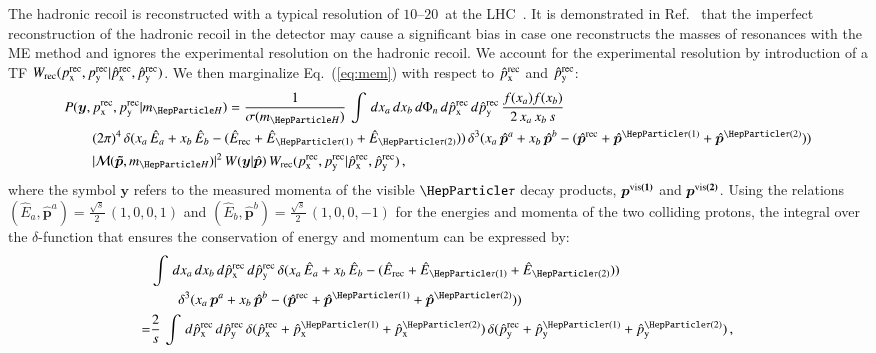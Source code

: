The hadronic recoil is reconstructed with a typical resolution of $10$--$20$~\GeV at the LHC~\cite{CMS-JME-13-003,ATLAS-CONF-2014-019}.
It is demonstrated in Ref.~\cite{Alwall:2010cq} that the imperfect reconstruction of the hadronic recoil
in the detector may cause a significant bias in case one reconstructs the masses of resonances
with the ME method and ignores the experimental resolution on the
hadronic recoil. We account
for the experimental resolution by introduction
of a TF $W_{\textrm{rec}}( p_{\textrm{x}}^{\textrm{rec}}, p_{\textrm{y}}^{\textrm{rec}} | \hat{p}_{\textrm{x}}^{\textrm{rec}},
\hat{p}_{\textrm{y}}^{\textrm{rec}} )$.
We then marginalize Eq.~(\ref{eq:mem}) with respect to $\hat{p}_{\textrm{x}}^{\textrm{rec}}$ and $\hat{p}_{\textrm{y}}^{\textrm{rec}}$:
\begin{align}
& P(\bm{y},\pX^{\rec},\pY^{\rec}|m_{\PHiggs}) =
\frac{1}{\sigma(m_{\PHiggs})} \, \int \, dx_{a} \, dx_{b} \, d\Phi_{n} \,
d\pXhat^{\rec} \, d\pYhat^{\rec} \, \frac{f(x_{a}) f(x_{b})}{2 \,
  x_{a} \, x_{b} \, s} \nonumber \\
& \qquad (2\pi)^{4} \, \delta( x_{a} \, \Ehat_{a} + x_{b} \, \Ehat_{b} -
(\Ehat_{\rec} + \Ehat_{\Pgt(1)} + \Ehat_{\Pgt(2)}) ) \, \delta^{3}( x_{a} \,
\hat{\bm{p}}^{a} + x_{b} \, \hat{\bm{p}}^{b} - (\hat{\bm{p}}^{\rec} + \hat{\bm{p}}^{\Pgt(1)}
+ \hat{\bm{p}}^{\Pgt(2)}) ) \nonumber \\
& \qquad \vert \mathcal{M}(\bm{\tilde{p}},m_{\PHiggs}) \vert^{2} \, W(\bm{y}|\hat{\bm{p}}) \, W_{\rec}( \pX^{\rec}, \pY^{\rec} | \pXhat^{\rec}, \pYhat^{\rec} ) \, ,
\label{eq:mem_mod_hadRecoil}
\end{align}
where the symbol $\bm{y}$ refers to the measured momenta of the visible $\Pgt$ decay products, $\bm{p^{\textrm{vis}(1)}}$ and $\bm{p^{\textrm{vis}(2)}}$.
Using the relations $(\hat{E}_{a},\hat{\bm{p}}^{a}) = \frac{\sqrt{s}}{2} \, (1, 0,
0, 1)$ and $(\hat{E}_{b},\hat{\bm{p}}^{b}) = \frac{\sqrt{s}}{2} \, (1,
0, 0, -1)$
for the energies and momenta of the two colliding protons,
the integral over the $\delta$-function that ensures the conservation of energy and momentum can be expressed by:
\begin{align}
& \int \, dx_{a} \, dx_{b} \, d\pXhat^{\rec} \, d\pYhat^{\rec} \, \delta(
x_{a} \, \Ehat_{a} + x_{b} \, \Ehat_{b} - (\Ehat_{\rec} +
\Ehat_{\Pgt(1)} + \Ehat_{\Pgt(2)})) \nonumber \\
& \qquad \delta^{3}(
x_{a} \, \bm{p}^{a} + x_{b} \, \hat{\bm{p}}^{b} - (\hat{\bm{p}}^{\rec} +
\hat{\bm{p}}^{\Pgt(1)} + \hat{\bm{p}}^{\Pgt(2)})) \nonumber \\
= & \frac{2}{s} \, \int \,
d\pXhat^{\rec} \, d\pYhat^{\rec} \, 
\delta( \pXhat^{\rec} + \pXhat^{\Pgt(1)} + \pXhat^{\Pgt(2)} ) \,
\delta( \pYhat^{\rec} + \pYhat^{\Pgt(1)} + \pYhat^{\Pgt(2)} ) \, ,
\label{eq:delta4}
\end{align}

